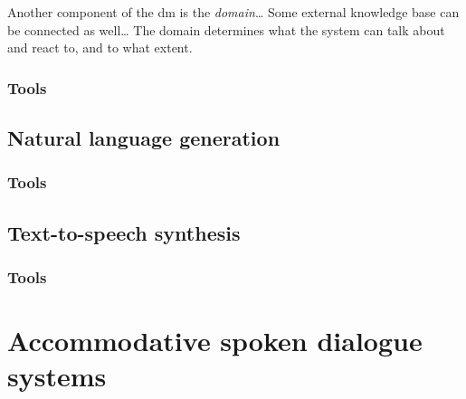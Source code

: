 Another component of the \ac{dm} is the \emph{domain}\ldots
Some external knowledge base can be connected as well\ldots
The domain determines what the system can talk about and react to, and to what extent.
\subsubsection{Tools}
\label{subsubsec:tools_dm}

\subsection{Natural language generation}
\label{subsec:natural_language_generation}

\subsubsection{Tools}
\label{subsubsec:tools_nlg}

\subsection{Text-to-speech synthesis}
\label{subsec:text-to-speech_synthesis}

\subsubsection{Tools}
\label{subsubsec:tools_tts}

\section{Accommodative spoken dialogue systems}
\label{sec:adaptive_spoken_dialogue_systems}

